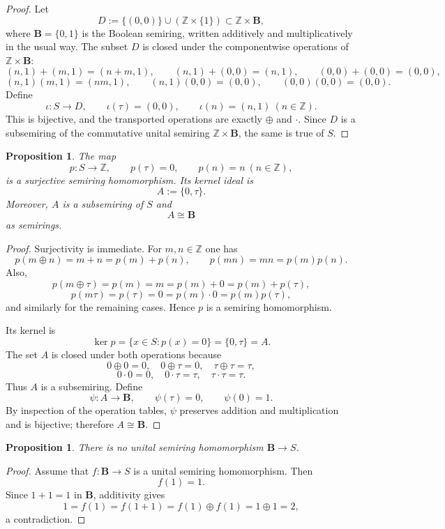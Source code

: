 \documentclass[11pt]{article}
\newtheorem{proposition}[theorem]{Proposition}
\theoremstyle{definition}
\newcommand{\Z}{\mathbb Z}
\newcommand{\B}{\mathbf B}
\newcommand{\taup}{\tau}
\begin{document}
\begin{proof}
Let
\[
D:=\{(0,0)\}\cup(\Z\times\{1\})\subset \Z\times \B,
\]
where \(\B=\{0,1\}\) is the Boolean semiring, written additively and multiplicatively in the usual way.  The subset \(D\) is closed under the componentwise operations of \(\Z\times \B\):
\[
(n,1)+(m,1)=(n+m,1),\qquad (n,1)+(0,0)=(n,1),\qquad (0,0)+(0,0)=(0,0),
\]
\[
(n,1)(m,1)=(nm,1),\qquad (n,1)(0,0)=(0,0),\qquad (0,0)(0,0)=(0,0).
\]
Define
\[
\iota:S\longrightarrow D,
\qquad
\iota(\taup)=(0,0),\qquad \iota(n)=(n,1)\ (n\in\Z).
\]
This is bijective, and the transported operations are exactly \(\oplus\) and \(\cdot\).  Since \(D\) is a subsemiring of the commutative unital semiring \(\Z\times\B\), the same is true of \(S\).
\end{proof}

\begin{proposition}\label{prop:projection-kernel}
The map
\[
p:S\longrightarrow \Z,
\qquad
p(\taup)=0,
\qquad
p(n)=n\ (n\in\Z),
\]
is a surjective semiring homomorphism.  Its kernel ideal is
\[
A:=\{0,\taup\}.
\]
Moreover, \(A\) is a subsemiring of \(S\) and
\[
A\cong \B
\]
as semirings.
\end{proposition}

\begin{proof}
Surjectivity is immediate.  For \(m,n\in\Z\) one has
\[
p(m\oplus n)=m+n=p(m)+p(n),\qquad p(mn)=mn=p(m)p(n).
\]
Also,
\[
p(m\oplus\taup)=p(m)=m=p(m)+0=p(m)+p(\taup),
\]
\[
p(m\taup)=p(\taup)=0=p(m)\cdot 0=p(m)p(\taup),
\]
and similarly for the remaining cases.  Hence \(p\) is a semiring homomorphism.

Its kernel is
\[
\ker p=\{x\in S:p(x)=0\}=\{0,\taup\}=A.
\]
The set \(A\) is closed under both operations because
\[
0\oplus 0=0,
\quad
0\oplus \taup=0,
\quad
\taup\oplus\taup=\taup,
\]
\[
0\cdot 0=0,
\quad
0\cdot \taup=\taup,
\quad
\taup\cdot\taup=\taup.
\]
Thus \(A\) is a subsemiring.  Define
\[
\psi:A\longrightarrow \B,
\qquad
\psi(\taup)=0,
\qquad
\psi(0)=1.
\]
By inspection of the operation tables, \(\psi\) preserves addition and multiplication and is bijective; therefore \(A\cong\B\).
\end{proof}

\begin{proposition}\label{prop:boolean-no-map}
There is no unital semiring homomorphism \(\B\to S\).
\end{proposition}

\begin{proof}
Assume that \(f:\B\to S\) is a unital semiring homomorphism.  Then
\[
f(1)=1.
\]
Since \(1+1=1\) in \(\B\), additivity gives
\[
1=f(1)=f(1+1)=f(1)\oplus f(1)=1\oplus 1=2,
\]
a contradiction.
\end{proof}
\end{document}
